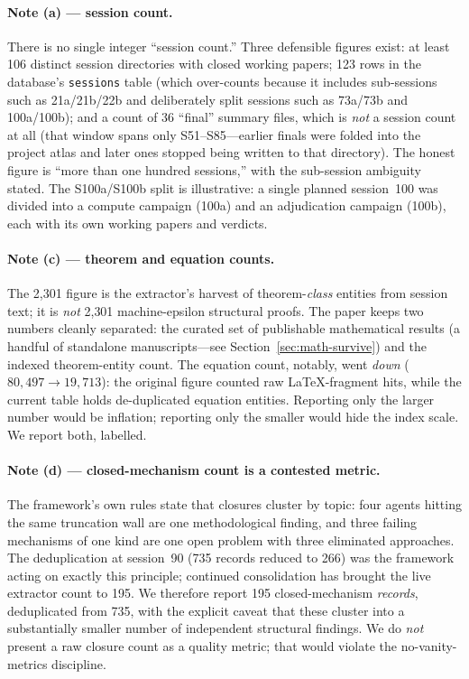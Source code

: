 \documentclass[12pt,a4paper]{article}
\begin{document}
\paragraph{Note (a) --- session count.} There is no single integer ``session count.'' Three defensible figures exist: at least 106 distinct session directories with closed working papers; 123 rows in the database's \texttt{sessions} table (which over-counts because it includes sub-sessions such as 21a/21b/22b and deliberately split sessions such as 73a/73b and 100a/100b); and a count of 36 ``final'' summary files, which is \emph{not} a session count at all (that window spans only S51--S85---earlier finals were folded into the project atlas and later ones stopped being written to that directory). The honest figure is ``more than one hundred sessions,'' with the sub-session ambiguity stated. The S100a/S100b split is illustrative: a single planned session~100 was divided into a compute campaign (100a) and an adjudication campaign (100b), each with its own working papers and verdicts.

\paragraph{Note (c) --- theorem and equation counts.} The 2{,}301 figure is the extractor's harvest of theorem-\emph{class} entities from session text; it is \emph{not} 2{,}301 machine-epsilon structural proofs. The paper keeps two numbers cleanly separated: the curated set of publishable mathematical results (a handful of standalone manuscripts---see Section~\ref{sec:math-survive}) and the indexed theorem-entity count. The equation count, notably, went \emph{down} ($80{,}497 \to 19{,}713$): the original figure counted raw LaTeX-fragment hits, while the current table holds de-duplicated equation entities. Reporting only the larger number would be inflation; reporting only the smaller would hide the index scale. We report both, labelled.

\paragraph{Note (d) --- closed-mechanism count is a contested metric.} The framework's own rules state that closures cluster by topic: four agents hitting the same truncation wall are one methodological finding, and three failing mechanisms of one kind are one open problem with three eliminated approaches. The deduplication at session~90 (735 records reduced to 266) was the framework acting on exactly this principle; continued consolidation has brought the live extractor count to 195. We therefore report 195 closed-mechanism \emph{records}, deduplicated from 735, with the explicit caveat that these cluster into a substantially smaller number of independent structural findings. We do \emph{not} present a raw closure count as a quality metric; that would violate the no-vanity-metrics discipline.
\end{document}
